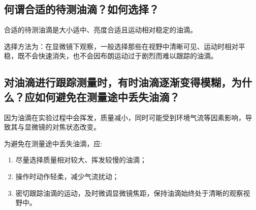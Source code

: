 \documentclass[]{../../templates/Report}%
\begin{document}
\begin{fullreportonly}
\subsection{何谓合适的待测油滴？如何选择？}
合适的待测油滴是大小适中、亮度合适且运动相对稳定的油滴。

\vspace{2mm}
选择方法为：在显微镜下观察，一般选择那些在视野中清晰可见、运动时相对平稳，既不会快速消失，也不会因布朗运动过于剧烈而难以跟踪的油滴。
\subsection{对油滴进行跟踪测量时，有时油滴逐渐变得模糊，为什么？应如何避免在测量途中丢失油滴？}
因为油滴在实验过程中会挥发，质量减小，同时可能受到环境气流等因素影响，导致其与显微镜的对焦状态改变。

\vspace{2mm}
为避免在测量途中丢失油滴，应:
\begin{enumerate}
    \item 尽量选择质量相对较大、挥发较慢的油滴；
    \item 操作时动作轻柔，减少气流扰动；
    \item 密切跟踪油滴的运动，及时微调显微镜焦距，保持油滴始终处于清晰的观察视野中。
\end{enumerate}
\end{fullreportonly}
\insertnotes
\end{document}
